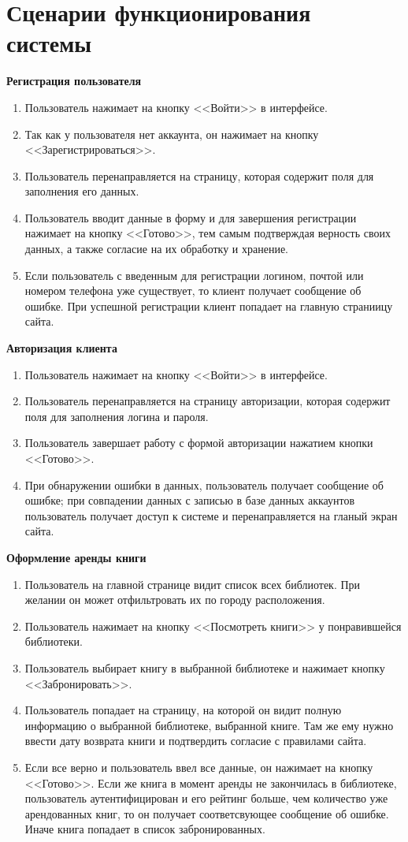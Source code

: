 \clearpage
\section{Сценарии функционирования системы}

\textbf{Регистрация пользователя}
\begin{enumerate}
	\item Пользователь нажимает на кнопку <<Войти>> в интерфейсе.
	\item Так как у пользователя нет аккаунта, он нажимает на кнопку <<Зарегистрироваться>>.
	\item Пользователь перенаправляется на страницу, которая содержит поля для заполнения его данных.
	\item Пользователь вводит данные в форму и для завершения регистрации нажимает на кнопку <<Готово>>, тем самым подтверждая верность своих данных, а также согласие на их обработку и хранение.
	\item Если пользователь с введенным для регистрации логином, почтой или номером телефона уже существует, то клиент получает сообщение об ошибке. При успешной регистрации клиент попадает на главную страниицу сайта.
\end{enumerate}

\textbf{Авторизация клиента}
\begin{enumerate}
	\item Пользователь нажимает на кнопку <<Войти>> в интерфейсе.
	\item Пользователь перенаправляется на страницу авторизации, которая содержит поля для заполнения логина и пароля.
	\item Пользователь завершает работу с формой авторизации нажатием кнопки <<Готово>>.
	\item При обнаружении ошибки в данных, пользователь получает сообщение об ошибке; при совпадении данных с записью в базе данных аккаунтов пользователь получает доступ к системе и перенаправляется на гланый экран сайта.
\end{enumerate}

\textbf{Оформление аренды книги}
\begin{enumerate}
	\item Пользователь на главной странице видит список всех библиотек. При желании он может отфильтровать их по городу расположения.
	\item Пользователь нажимает на кнопку <<Посмотреть книги>> у понравившейся библиотеки.
  \item Пользователь выбирает книгу в выбранной библиотеке и нажимает кнопку <<Забронировать>>.
	\item Пользователь попадает на страницу, на которой он видит полную информацию о выбранной библиотеке, выбранной книге. Там же ему нужно ввести дату возврата книги и подтвердить согласие с правилами сайта.
	\item Если все верно и пользователь ввел все данные, он нажимает на кнопку <<Готово>>. Если же книга в момент аренды не закончилась в библиотеке, пользователь аутентифицирован и его рейтинг больше, чем количество уже арендованных книг, то он получает соответсвующее сообщение об ошибке. Иначе книга попадает в список забронированных.
\end{enumerate}

